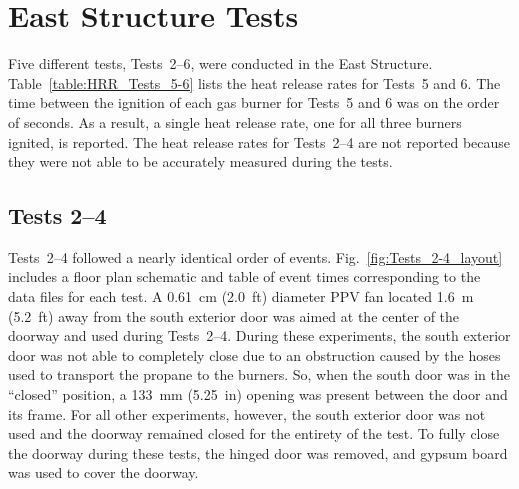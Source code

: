 \documentclass[12pt,oneside]{book}
\begin{document}
\section{East Structure Tests}
\label{sec:east_procedure}
Five different tests, Tests~2--6, were conducted in the East Structure. Table~\ref{table:HRR_Tests_5-6} lists the heat release rates for Tests~5 and 6. The time between the ignition of each gas burner for Tests~5 and 6 was on the order of seconds. As a result, a single heat release rate, one for all three burners ignited, is reported. The heat release rates for Tests~2--4 are not reported because they were not able to be accurately measured during the tests. 

\subsection{Tests 2--4}
Tests~2--4 followed a nearly identical order of events. Fig.~\ref{fig:Tests_2-4_layout} includes a floor plan schematic and table of event times corresponding to the data files for each test. A 0.61~cm (2.0~ft) diameter PPV fan located 1.6~m (5.2~ft) away from the south exterior door was aimed at the center of the doorway and used during Tests~2--4. During these experiments, the south exterior door was not able to completely close due to an obstruction caused by the hoses used to transport the propane to the burners. So, when the south door was in the ``closed'' position, a 133~mm (5.25~in) opening was present between the door and its frame. For all other experiments, however, the south exterior door was not used and the doorway remained closed for the entirety of the test. To fully close the doorway during these tests, the hinged door was removed, and gypsum board was used to cover the doorway.
\end{document}
